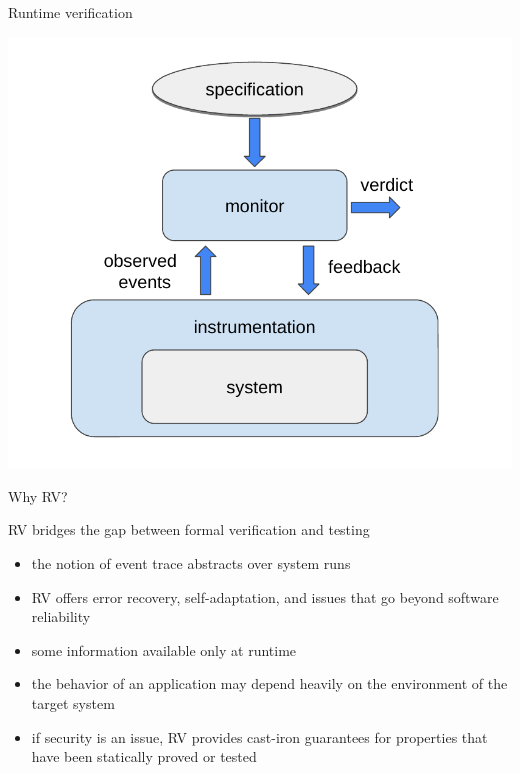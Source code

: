 \documentclass[10pt,usenames,dvipsnames]{beamer}
\begin{document}
\begin{frame}{Runtime verification}

  \begin{center}
    \includegraphics[keepaspectratio,height=0.7\textheight]{images/rv}
  \end{center}

\end{frame}

\begin{frame}{Why RV?}
  \begin{block}{RV bridges the gap between formal verification and testing}
    \begin{itemize}
    \item the notion of event trace abstracts over system runs
    \item RV offers error recovery, self-adaptation, and issues that go beyond software reliability
    \item some information available only at runtime
    \item the behavior of an application may depend heavily on the environment of the target system
    \item if security is an issue, RV provides cast-iron guarantees for properties that have been statically proved or tested
    \end{itemize}
  \end{block}
\end{frame}
\end{document}
